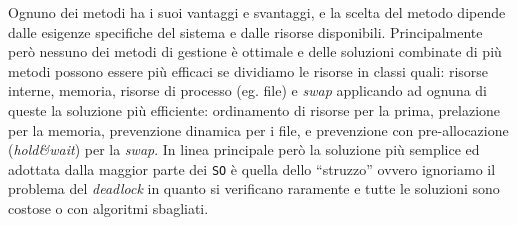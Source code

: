         Ognuno dei metodi ha i suoi vantaggi e svantaggi, e la scelta del metodo dipende dalle esigenze specifiche del sistema e dalle risorse disponibili. Principalmente però nessuno dei metodi di gestione è ottimale e delle soluzioni combinate di più metodi possono essere più efficaci se dividiamo le risorse in classi quali: risorse interne, memoria, risorse di processo (eg. file) e \textit{swap} applicando ad ognuna di queste la soluzione più efficiente: ordinamento di risorse per la prima, prelazione per la memoria, prevenzione dinamica per i file, e prevenzione con pre-allocazione (\textit{hold\&wait}) per la \textit{swap}.\newline
        In linea principale però la soluzione più semplice ed adottata dalla maggior parte dei \texttt{SO} è quella dello ``struzzo'' ovvero ignoriamo il problema del \textit{deadlock} in quanto si verificano raramente e tutte le soluzioni sono costose o con algoritmi sbagliati.
